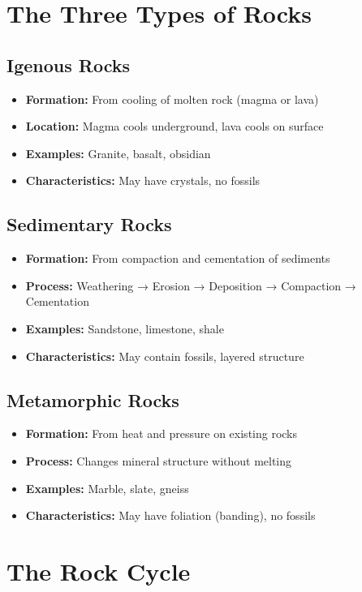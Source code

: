 \documentclass{article}
\begin{document}
\section{The Three Types of Rocks}

\subsection{Igenous Rocks}
\begin{itemize}
    \item \textbf{Formation:} From cooling of molten rock (magma or lava)
    \item \textbf{Location:} Magma cools underground, lava cools on surface
    \item \textbf{Examples:} Granite, basalt, obsidian
    \item \textbf{Characteristics:} May have crystals, no fossils
\end{itemize}

\subsection{Sedimentary Rocks}
\begin{itemize}
    \item \textbf{Formation:} From compaction and cementation of sediments
    \item \textbf{Process:} Weathering → Erosion → Deposition → Compaction → Cementation
    \item \textbf{Examples:} Sandstone, limestone, shale
    \item \textbf{Characteristics:} May contain fossils, layered structure
\end{itemize}

\subsection{Metamorphic Rocks}
\begin{itemize}
    \item \textbf{Formation:} From heat and pressure on existing rocks
    \item \textbf{Process:} Changes mineral structure without melting
    \item \textbf{Examples:} Marble, slate, gneiss
    \item \textbf{Characteristics:} May have foliation (banding), no fossils
\end{itemize}

\section{The Rock Cycle}
\end{document}
